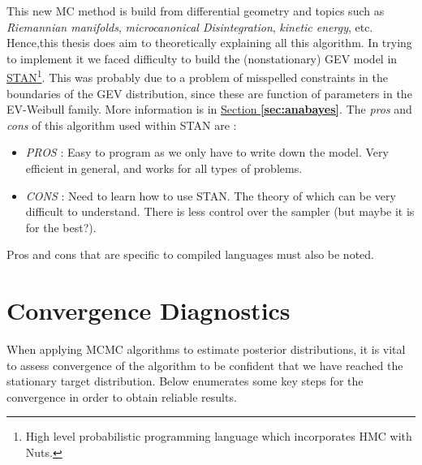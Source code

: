 This new MC method is build from differential geometry and topics such as \emph{Riemannian manifolds}, \emph{microcanonical Disintegration},\emph{ kinetic energy}, etc. Hence,this thesis does aim to theoretically explaining all this algorithm. In trying to implement it we faced difficulty to build the (nonstationary) GEV model in \href{http://mc-stan.org/}{STAN}\footnote{High level probabilistic programming language which incorporates HMC with Nuts.}. This was probably due to a problem of misspelled constraints in the boundaries of the GEV distribution, since these are function of parameters in the EV-Weibull family. More information is in \hyperref[sec:anabayes]{Section \textbf{\ref{sec:anabayes}}}.
The \emph{pros} and \emph{cons} of this algorithm used within STAN are : 
\begin{itemize}
	\item \emph{PROS} : Easy to program as we only have to write down the model. Very efficient in general, and works for all types of problems.
	\item \emph{CONS} : Need to learn how to use STAN. The theory of which can be very difficult to understand. There is less control over the sampler (but maybe it is for the best?).
\end{itemize}
Pros and cons that are specific to compiled languages must also be noted.


\section{Convergence Diagnostics}\label{sec:convbay}

When applying MCMC algorithms to estimate posterior distributions, it is vital to assess convergence of the algorithm to be confident that we have reached the stationary target distribution. Below enumerates some key steps for the convergence in order to obtain reliable results.

